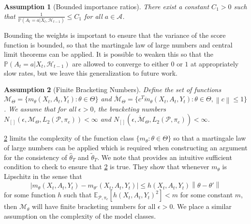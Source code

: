 \documentclass[11pt]{article}
\newcommand{\E}{\mathbb{E}}
\newcommand{\norm}[1]{\left\lVert#1\right\rVert}
\newtheorem{assumption}{Assumption}
\begin{document}
\begin{assumption}[Bounded importance ratios] \label{assumption:bounded_importance}
There exist a constant $C_{1}> 0$ such that  $ \frac{1}{ \mathbb{P} \left(A_{t}=a| X_{t}, \mathcal{H}_{t-1} \right) } \le C_{1}$ for all $a\in \mathcal{A}$. 
\end{assumption}
Bounding the weights is important to ensure that the variance of the score function is bounded, so that the martingale law of large numbers and central limit theorems can be applied. It is possible to weaken this so that the $\mathbb{P} \left(A_{t}=a| X_{t}, \mathcal{H}_{t-1} \right)$ are allowed to converge to either $0$ or $1$ at appropriately slow rates, but we leave this generalization to future work. 



\begin{assumption}[Finite Bracketing Numbers] \label{assumption:bracket3}
Define the set of functions
$ \mathcal{M}_{\Theta} =  \{ m_{\theta}(X_t,A_{t},Y_{t}) : \theta \in \Theta  \}$ and
$ \dot{\mathcal{M}}_{\Theta} =  \{c^{T}\dot{m}_{\theta}(X_t,A_{t},Y_{t}) : \theta \in \Theta , \norm{c} \le 1 \}$. We assume that for all $\epsilon>0$, the bracketing numbers  $N_{[]}(\epsilon, \mathcal{M}_{\Theta}, L_{2}(\mathcal{P},\pi_{e})) < \infty$ and $N_{[]}(\epsilon, \dot{\mathcal{M}}_{\Theta}, L_{2}(\mathcal{P},\pi_{e})) < \infty$. 


\end{assumption}
\cref{assumption:bracket3} limits the complexity of the function class $\{ m_{\theta} : \theta \in \Theta\}$ so that a martingale law of large numbers can be applied which is required when constructing an argument for the consistency of $\hat{\theta}_{T}$ and $\tilde{\theta}_{T}$. We note that \cite{zhang2021mestimators} provides an intuitive sufficient condition to check to ensure that \cref{assumption:bracket3} is true. They show that whenever $m_{\theta}$ is Lipschitz in the sense that 
$$|m_{\theta}(X_{t},A_{t},Y_{t}) - m_{\theta'}(X_{t},A_{t},Y_{t})| \le h(X_{t},A_{t},Y_{t}) \norm{\theta - \theta'}$$
for some function $h$ such that $\E_{\mathcal{P},\pi_e}[h(X_t,A_t,Y_t)^{2}] < m $ for some constant $m$, then $\mathcal{M}_{\theta}$ will have finite bracketing numbers for all $\epsilon > 0 $. 
We place a similar assumption on the complexity of the model classes. 
\end{document}

